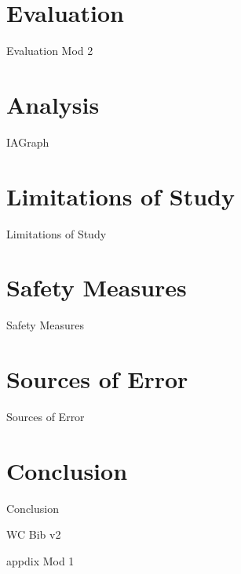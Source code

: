 \documentclass[12pt, a4paper]{article}
\begin{document}
        
        
        
        

\section{{Evaluation}}

	{Evaluation Mod 2}
        
\section{{Analysis}}
        

			{IAGraph}
        
        
        
        
\section{{Limitations of Study}}
        
        {Limitations of Study}
    
\section{{Safety Measures}}
        
        {Safety Measures} 
                
\section{{Sources of Error}}
        
        {Sources of Error}
        
\section{{Conclusion}}
        
        {Conclusion}
        

        
\clearpage

{WC}
{Bib v2}


\clearpage

\appendix

\appendixpage

{appdix Mod 1}
\end{document}
